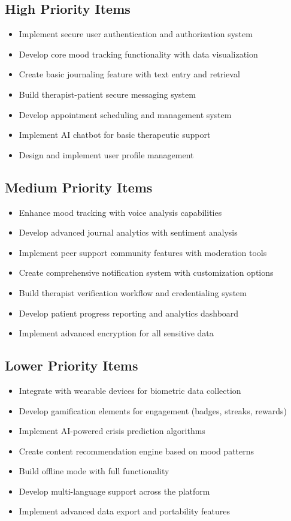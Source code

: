 \subsection{High Priority Items}
\begin{itemize}
    \item Implement secure user authentication and authorization system
    \item Develop core mood tracking functionality with data visualization
    \item Create basic journaling feature with text entry and retrieval
    \item Build therapist-patient secure messaging system
    \item Develop appointment scheduling and management system
    \item Implement AI chatbot for basic therapeutic support
    \item Design and implement user profile management
\end{itemize}

\subsection{Medium Priority Items}
\begin{itemize}
    \item Enhance mood tracking with voice analysis capabilities
    \item Develop advanced journal analytics with sentiment analysis
    \item Implement peer support community features with moderation tools
    \item Create comprehensive notification system with customization options
    \item Build therapist verification workflow and credentialing system
    \item Develop patient progress reporting and analytics dashboard
    \item Implement advanced encryption for all sensitive data
\end{itemize}

\subsection{Lower Priority Items}
\begin{itemize}
    \item Integrate with wearable devices for biometric data collection
    \item Develop gamification elements for engagement (badges, streaks, rewards)
    \item Implement AI-powered crisis prediction algorithms
    \item Create content recommendation engine based on mood patterns
    \item Build offline mode with full functionality
    \item Develop multi-language support across the platform
    \item Implement advanced data export and portability features
\end{itemize}

